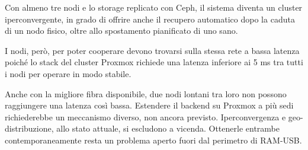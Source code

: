 Con almeno tre nodi e lo storage replicato con Ceph, il sistema diventa un cluster iperconvergente, 
in grado di offrire anche il recupero automatico dopo la caduta di un nodo fisico, oltre allo spostamento 
pianificato di uno sano. 

I nodi, però, per poter cooperare devono trovarsi sulla stessa rete a bassa latenza poiché lo stack del cluster 
Proxmox richiede una latenza inferiore ai 5 ms tra tutti i nodi \cite{proxmox-cluster-manager} per operare 
in modo stabile.

Anche con la migliore fibra disponibile, due nodi lontani tra loro non possono raggiungere una latenza così 
bassa. Estendere il backend su Proxmox a più sedi richiederebbe un meccanismo diverso, non ancora previsto.
Iperconvergenza e geo-distribuzione, allo stato attuale, si escludono a vicenda.
Ottenerle entrambe contemporaneamente resta un problema aperto fuori dal perimetro di RAM-USB.